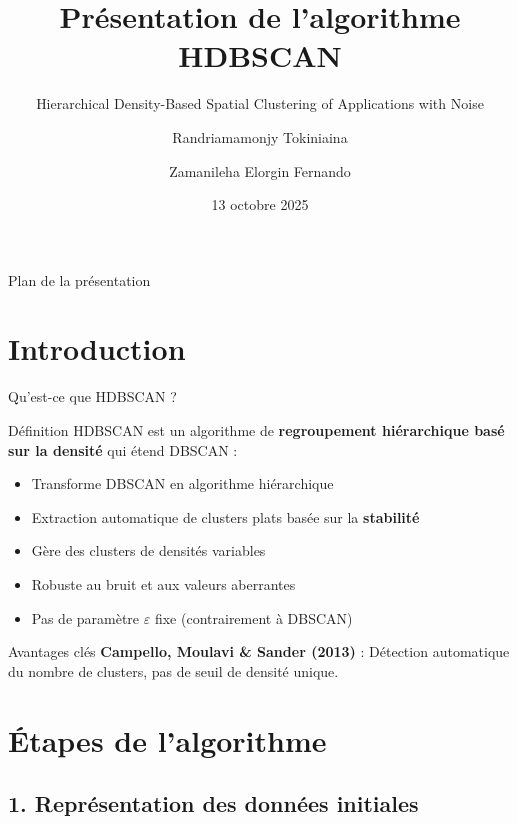 \documentclass[aspectratio=139,8pt]{beamer}
\title[HDBSCAN]{Présentation de l'algorithme HDBSCAN}
\subtitle{Hierarchical Density-Based Spatial Clustering of Applications with Noise}
\author[T. Randriamamonjy \& E. Zamanileha]{Randriamamonjy Tokiniaina \and Zamanileha Elorgin Fernando}
\date{13 octobre 2025}
\institute[Université d'Antananarivo]{Université d'Antananarivo, Facultés des sciences, Département des Mathématiques}
\begin{document}
\begin{frame}
\titlepage
\end{frame}

\begin{frame}{Plan de la présentation}
\tableofcontents
\end{frame}

\section{Introduction}

\begin{frame}{Qu'est-ce que HDBSCAN ?}
\begin{block}{Définition}
HDBSCAN est un algorithme de \textbf{regroupement hiérarchique basé sur la densité} qui étend DBSCAN :
\begin{itemize}
\item Transforme DBSCAN en algorithme hiérarchique
\item Extraction automatique de clusters plats basée sur la \textbf{stabilité}
\item Gère des clusters de densités variables
\item Robuste au bruit et aux valeurs aberrantes
\item Pas de paramètre $\varepsilon$ fixe (contrairement à DBSCAN)
\end{itemize}
\end{block}

\begin{alertblock}{Avantages clés}
\textbf{Campello, Moulavi \& Sander (2013)} : Détection automatique du nombre de clusters, pas de seuil de densité unique.
\end{alertblock}
\end{frame}

\section{Étapes de l'algorithme}

\subsection{1. Représentation des données initiales}
\end{document}

